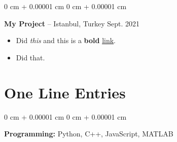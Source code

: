 \documentclass[10pt, letterpaper]{article}
\newenvironment{highlights}{
    \begin{itemize}[
        topsep=0.10 cm,
        parsep=0.10 cm,
        partopsep=0pt,
        itemsep=0pt,
        leftmargin=0 cm + 10pt
    ]
}{
    \end{itemize}
        
    \vspace{-0.20cm}
} %
\newenvironment{onecolentry}{
    \begin{adjustwidth}{
        0 cm + 0.00001 cm
    }{
        0 cm + 0.00001 cm
    }
}{
    \end{adjustwidth}
} %
\begin{document}
        \vspace{0.1 cm}

        \begin{onecolentry}
            \textbf{My Project} -- Istanbul, Turkey \hfill Sept. 2021
            \begin{highlights}
                \item Did \textit{this} and this is a \textbf{bold} \href{https://example.com}{link}.
                \item Did that.
            \end{highlights}
        \end{onecolentry}


    
    \section{One Line Entries}

        
        \begin{onecolentry}
            \textbf{Pro\textnormal{gram}ming:} Python, C++, JavaScript, MATLAB
        \end{onecolentry}


    
\end{document}
